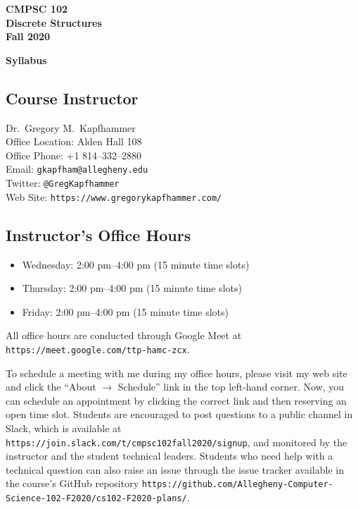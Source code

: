 \documentclass[11pt]{article}
\newcommand{\url}[1]{\lstinline{#1}}
\newcommand{\syllabustitle}[1]
{
  \begin{center}
    \begin{center}
      \bf
      CMPSC 102\\Discrete Structures\\
      Fall 2020\\
      \medskip
    \end{center}
    \bf
    #1
  \end{center}
}
\begin{document}
\thispagestyle{empty}

\syllabustitle{Syllabus}

\vspace*{-.175in}

\subsection*{Course Instructor}

Dr.\ Gregory M.\ Kapfhammer\\
\noindent Office Location: Alden Hall 108 \\
\noindent Office Phone: +1 814--332--2880 \\
\noindent Email: \url{gkapfham@allegheny.edu} \\
\noindent Twitter: \url{@GregKapfhammer} \\
\noindent Web Site: \url{https://www.gregorykapfhammer.com/}

\vspace*{-.115in}

\subsection*{Instructor's Office Hours}

\begin{itemize}

  \itemsep0em

  \item Wednesday: 2:00 pm--4:00 pm (15 minute time slots)

  \item Thursday: 2:00 pm--4:00 pm (15 minute time slots)

  \item Friday: 2:00 pm--4:00 pm (15 minute time slots)

\end{itemize}

\vspace*{-.075in}

\noindent All office hours are conducted through Google Meet at
\url{https://meet.google.com/ttp-hamc-zcx}.

\noindent To schedule a meeting with me during my office hours, please visit my
web site and click the ``About $\rightarrow$ Schedule'' link in the top
left-hand corner. Now, you can schedule an appointment by clicking the correct
link and then reserving an open time slot. Students are encouraged to post
questions to a public channel in Slack, which is available at
\url{https://join.slack.com/t/cmpsc102fall2020/signup}, and monitored by the
instructor and the student technical leaders. Students who need help with a
technical question can also raise an issue through the issue tracker available
in the course's GitHub repository
\url{https://github.com/Allegheny-Computer-Science-102-F2020/cs102-F2020-plans/}.
\end{document}
